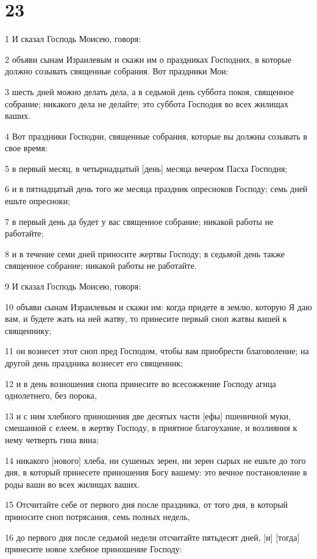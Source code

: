 \chapter{23}

\par 1 И сказал Господь Моисею, говоря:
\par 2 объяви сынам Израилевым и скажи им о праздниках Господних, в которые должно созывать священные собрания. Вот праздники Мои:
\par 3 шесть дней можно делать дела, а в седьмой день суббота покоя, священное собрание; никакого дела не делайте; это суббота Господня во всех жилищах ваших.
\par 4 Вот праздники Господни, священные собрания, которые вы должны созывать в свое время:
\par 5 в первый месяц, в четырнадцатый [день] месяца вечером Пасха Господня;
\par 6 и в пятнадцатый день того же месяца праздник опресноков Господу; семь дней ешьте опресноки;
\par 7 в первый день да будет у вас священное собрание; никакой работы не работайте;
\par 8 и в течение семи дней приносите жертвы Господу; в седьмой день также священное собрание; никакой работы не работайте.
\par 9 И сказал Господь Моисею, говоря:
\par 10 объяви сынам Израилевым и скажи им: когда придете в землю, которую Я даю вам, и будете жать на ней жатву, то принесите первый сноп жатвы вашей к священнику;
\par 11 он вознесет этот сноп пред Господом, чтобы вам приобрести благоволение; на другой день праздника вознесет его священник;
\par 12 и в день возношения снопа принесите во всесожжение Господу агнца однолетнего, без порока,
\par 13 и с ним хлебного приношения две десятых части [ефы] пшеничной муки, смешанной с елеем, в жертву Господу, в приятное благоухание, и возлияния к нему четверть гина вина;
\par 14 никакого [нового] хлеба, ни сушеных зерен, ни зерен сырых не ешьте до того дня, в который принесете приношения Богу вашему: это вечное постановление в роды ваши во всех жилищах ваших.
\par 15 Отсчитайте себе от первого дня после праздника, от того дня, в который приносите сноп потрясания, семь полных недель,
\par 16 до первого дня после седьмой недели отсчитайте пятьдесят дней, [и] [тогда] принесите новое хлебное приношение Господу:
